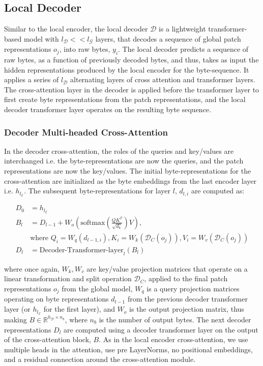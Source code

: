 \subsection{Local Decoder} 

Similar to the local encoder, the local decoder  $\mathcal{D}$ is a lightweight transformer-based model with $l_{\mathcal{D}} << l_{\mathcal{G}}$ layers, that decodes a sequence of global patch representations $o_j$, into raw bytes, $y_i$. The local decoder predicts a sequence of raw bytes, as a function of previously decoded bytes, and thus, takes as input the hidden representations produced by the local encoder for the byte-sequence. It applies a series of $l_{\mathcal{D}}$ alternating layers of cross attention and transformer layers. The cross-attention layer in the decoder is applied before the transformer layer to first create byte representations from the patch representations, and the local decoder transformer layer operates on the resulting byte sequence. 

\subsubsection{Decoder Multi-headed Cross-Attention} 

In the decoder cross-attention, the roles of the queries and key/values are interchanged i.e. the byte-representations are now the queries, and the patch representations are now the key/values. The initial byte-representations for the cross-attention are initialized as the byte embeddings from the last encoder layer i.e. $h_{l_{\mathcal{E}}}$. The subsequent byte-representations for layer $l$, $d_{l,i}$ are computed as:

\begin{align}
D_0 &= h_{l_{\mathcal{E}}} \\
B_l &= D_{l-1} + W_o\left(\text{softmax}\left(\frac{QK^T}{\sqrt{d_k}}\right)V\right), \\
  &\text{where } Q_i = W_q(d_{l-1,i}), K_i = W_k(\mathcal{D}_C(o_j)), V_i = W_v(\mathcal{D}_C(o_j)) \\
  D_l &= \text{Decoder-Transformer-layer}_l(B_l)
\end{align}

where once again, $W_k, W_v$ are key/value projection matrices that operate on a linear transformation and split operation $\mathcal{D}_C$, applied to the final patch representations $o_j$ from the global model, $W_q$ is a query projection matrices operating on byte representations $d_{l-1}$ from the previous decoder transformer layer (or $h_{l_{\mathcal{E}}}$ for the first layer), and $W_o$ is the output projection matrix, thus making $B \in \mathbb{R}^{h_{\mathcal{D}} \times n_b}$, where $n_b$ is the number of output bytes. The next decoder representations $D_l$ are computed using a decoder transformer layer on the output of the cross-attention block, $B$. As in the local encoder cross-attention, we use multiple heads in the attention, use pre LayerNorms, no positional embeddings, and a residual connection around the cross-attention module. 

